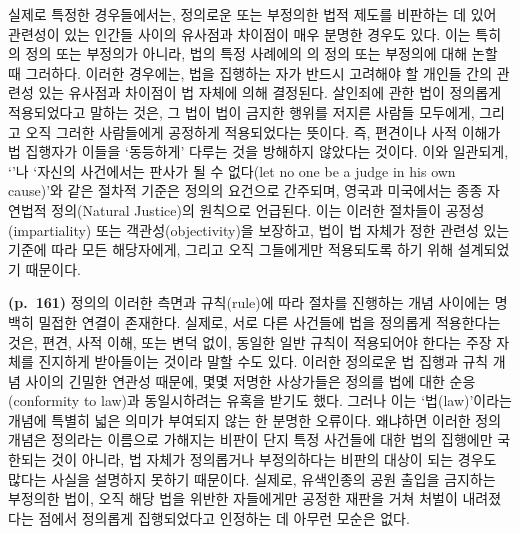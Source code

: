 실제로 특정한 경우들에서는, 정의로운 또는 부정의한 법적 제도를 비판하는
데 있어 관련성이 있는 인간들 사이의 유사점과 차이점이 매우 분명한 경우도
있다. 이는 특히 의 정의 또는 부정의가 아니라, 법의 특정
사례에의 의 정의 또는 부정의에 대해 논할 때
그러하다. 이러한 경우에는, 법을 집행하는 자가 반드시 고려해야 할 개인들
간의 관련성 있는 유사점과 차이점이 법 자체에 의해 결정된다. 살인죄에
관한 법이 정의롭게 적용되었다고 말하는 것은, 그 법이 법이 금지한 행위를
저지른 사람들 모두에게, 그리고 오직 그러한 사람들에게 공정하게
적용되었다는 뜻이다. 즉, 편견이나 사적 이해가 법 집행자가 이들을
`동등하게' 다루는 것을 방해하지 않았다는 것이다. 이와 일관되게,
`'나 `자신의 사건에서는
판사가 될 수 없다(let no one be a judge in his own cause)'와 같은 절차적
기준은 정의의 요건으로 간주되며, 영국과 미국에서는 종종 자연법적
정의(Natural Justice)의 원칙으로 언급된다. 이는 이러한 절차들이
공정성(impartiality) 또는 객관성(objectivity)을 보장하고, 법이 법 자체가
정한 관련성 있는 기준에 따라 모든 해당자에게, 그리고 오직 그들에게만
적용되도록 하기 위해 설계되었기 때문이다.

\textbf{(p.~161)} 정의의 이러한 측면과 규칙(rule)에 따라 절차를 진행하는
개념 사이에는 명백히 밀접한 연결이 존재한다. 실제로, 서로 다른 사건들에
법을 정의롭게 적용한다는 것은, 편견, 사적 이해, 또는 변덕 없이, 동일한
일반 규칙이 적용되어야 한다는 주장 자체를 진지하게 받아들이는 것이라
말할 수도 있다. 이러한 정의로운 법 집행과 규칙 개념 사이의 긴밀한 연관성
때문에, 몇몇 저명한 사상가들은 정의를 법에 대한 순응(conformity to
law)과 동일시하려는 유혹을 받기도 했다. 그러나 이는 `법(law)'이라는
개념에 특별히 넓은 의미가 부여되지 않는 한 분명한 오류이다. 왜냐하면
이러한 정의 개념은 정의라는 이름으로 가해지는 비판이 단지 특정 사건들에
대한 법의 집행에만 국한되는 것이 아니라, 법 자체가 정의롭거나
부정의하다는 비판의 대상이 되는 경우도 많다는 사실을 설명하지 못하기
때문이다. 실제로, 유색인종의 공원 출입을 금지하는 부정의한 법이, 오직
해당 법을 위반한 자들에게만 공정한 재판을 거쳐 처벌이 내려졌다는 점에서
정의롭게 집행되었다고 인정하는 데 아무런 모순은 없다.

